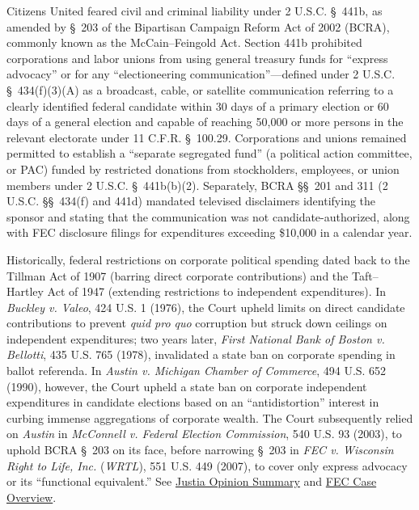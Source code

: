 \documentclass[12pt]{article}
\begin{document}
Citizens United feared civil and criminal liability under 2 U.S.C. \S~441b, as amended by \S~203 of the Bipartisan Campaign Reform Act of 2002 (BCRA), commonly known as the McCain--Feingold Act. Section 441b prohibited corporations and labor unions from using general treasury funds for ``express advocacy'' or for any ``electioneering communication''---defined under 2 U.S.C. \S~434(f)(3)(A) as a broadcast, cable, or satellite communication referring to a clearly identified federal candidate within 30 days of a primary election or 60 days of a general election and capable of reaching 50,000 or more persons in the relevant electorate under 11 C.F.R. \S~100.29. Corporations and unions remained permitted to establish a ``separate segregated fund'' (a political action committee, or PAC) funded by restricted donations from stockholders, employees, or union members under 2 U.S.C. \S~441b(b)(2). Separately, BCRA \S\S~201 and 311 (2 U.S.C. \S\S~434(f) and 441d) mandated televised disclaimers identifying the sponsor and stating that the communication was not candidate-authorized, along with FEC disclosure filings for expenditures exceeding \$10,000 in a calendar year.

Historically, federal restrictions on corporate political spending dated back to the Tillman Act of 1907 (barring direct corporate contributions) and the Taft--Hartley Act of 1947 (extending restrictions to independent expenditures). In \textit{Buckley v. Valeo}, 424 U.S. 1 (1976), the Court upheld limits on direct candidate contributions to prevent \textit{quid pro quo} corruption but struck down ceilings on independent expenditures; two years later, \textit{First National Bank of Boston v. Bellotti}, 435 U.S. 765 (1978), invalidated a state ban on corporate spending in ballot referenda. In \textit{Austin v. Michigan Chamber of Commerce}, 494 U.S. 652 (1990), however, the Court upheld a state ban on corporate independent expenditures in candidate elections based on an ``antidistortion'' interest in curbing immense aggregations of corporate wealth. The Court subsequently relied on \textit{Austin} in \textit{McConnell v. Federal Election Commission}, 540 U.S. 93 (2003), to uphold BCRA \S~203 on its face, before narrowing \S~203 in \textit{FEC v. Wisconsin Right to Life, Inc.} (\textit{WRTL}), 551 U.S. 449 (2007), to cover only express advocacy or its ``functional equivalent.'' See \href{https://supreme.justia.com/cases/federal/us/558/310/}{Justia Opinion Summary} and \href{https://www.fec.gov/legal-resources/court-cases/citizens-united-v-fec/}{FEC Case Overview}.
\end{document}
